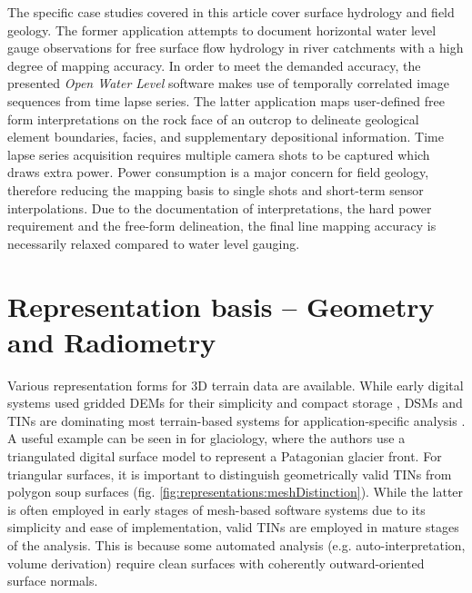 \documentclass[review]{elsarticle}
\begin{document}
The specific case studies covered in this article cover surface hydrology and field geology. The former application attempts to document horizontal water level gauge observations for free surface flow hydrology in river catchments with a high degree of mapping accuracy. In order to meet the demanded accuracy, the presented \textit{Open Water Level} software makes use of temporally correlated image sequences from time lapse series. The latter application maps user-defined free form interpretations on the rock face of an outcrop to delineate geological element boundaries, facies, and supplementary depositional information. Time lapse series acquisition requires multiple camera shots to be captured which draws extra power. Power consumption is a major concern for field geology, therefore reducing the mapping basis to single shots and short-term sensor interpolations. Due to the documentation of interpretations, the hard power requirement and the free-form delineation, the final line mapping accuracy is necessarily relaxed compared to water level gauging.

\section{Representation basis -- Geometry and Radiometry}
\label{sec:representations}

Various representation forms for 3D terrain data are available. While early digital systems used gridded \glspl{DEM} for their simplicity and compact storage \cite{Trinks2005,McCaffrey2005}, \glspl{DSM} and \glspl{TIN} are dominating most terrain-based systems for application-specific analysis \cite{Buckley2008a,Caumon2013}. A useful example can be seen in \cite{Schwalbe2017b} for glaciology, where the authors use a  triangulated digital surface model to represent a Patagonian glacier front.
For triangular surfaces, it is important to distinguish geometrically valid \glspl{TIN} from polygon soup surfaces (fig. \ref{fig:representations:meshDistinction}). While the latter is often employed in early stages of mesh-based software systems due to its simplicity and ease of implementation, valid \glspl{TIN} are employed in mature stages of the analysis. This is because some automated analysis (e.g. auto-interpretation, volume derivation) require clean surfaces with coherently outward-oriented surface normals.
\end{document}
